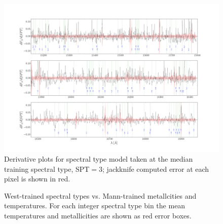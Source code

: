 \documentclass[twocolumn]{aastex62}
\newcommand{\cannon}{\textsl{Cannon}}
\newcommand{\teff}{T_{\mathrm{eff}}}
\newcommand{\feh}{[{\mathrm{Fe}/\mathrm{H}}]}
\begin{document}
\begin{figure}[h]
	\begin{center}
	\includegraphics[width=16cm]{figures/derivative_jackknife_spt.png}
	\end{center}
	\caption{Derivative plots for spectral type model taken at the median training spectral type, SPT$=3$; jackknife computed error at each pixel is shown in red.} 
	\label{fig:west_derivative}
\end{figure}

\begin{figure}[h]
	\caption{West-trained spectral types vs. Mann-trained metallcities and temperatures. For each integer spectral type bin the mean temperatures and metallicities are shown as red error boxes. \label{fig:west_vs_mann}}
\end{figure}




\end{document}
